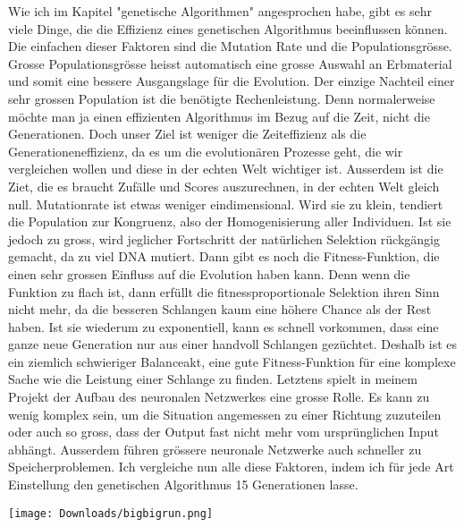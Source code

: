 \documentclass[10pt,a4paper,ngerman,english]{article}
\begin{document}
Wie ich im Kapitel "genetische Algorithmen" angesprochen habe, gibt es sehr viele Dinge, die die Effizienz eines genetischen Algorithmus beeinflussen können. Die einfachen dieser Faktoren sind die Mutation Rate und die Populationsgrösse. Grosse Populationsgrösse heisst automatisch eine grosse Auswahl an Erbmaterial und somit eine bessere Ausgangslage für die Evolution. Der einzige Nachteil einer sehr grossen Population ist die benötigte Rechenleistung. Denn normalerweise möchte man ja einen effizienten Algorithmus im Bezug auf die Zeit, nicht die Generationen. Doch unser Ziel ist weniger die Zeiteffizienz als die Generationeneffizienz, da es um die evolutionären Prozesse geht, die wir vergleichen wollen und diese in der echten Welt wichtiger ist. Ausserdem ist die Ziet, die es braucht Zufälle und Scores auszurechnen, in der echten Welt gleich null. Mutationrate ist etwas weniger eindimensional. Wird sie zu klein, tendiert die Population zur Kongruenz, also der Homogenisierung aller Individuen. Ist sie jedoch zu gross, wird jeglicher Fortschritt der natürlichen Selektion rückgängig gemacht, da zu viel DNA mutiert. Dann gibt es noch die Fitness-Funktion, die einen sehr grossen Einfluss auf die Evolution haben kann. Denn wenn die Funktion zu flach ist, dann erfüllt die fitnessproportionale Selektion ihren Sinn nicht mehr, da die besseren Schlangen kaum eine höhere Chance als der Rest haben. Ist sie wiederum zu exponentiell, kann es schnell vorkommen, dass eine ganze neue Generation nur aus einer handvoll Schlangen gezüchtet. Deshalb ist es ein ziemlich schwieriger Balanceakt, eine gute Fitness-Funktion für eine komplexe Sache wie die Leistung einer Schlange zu finden. Letztens spielt in meinem Projekt der Aufbau des neuronalen Netzwerkes eine grosse Rolle. Es kann zu wenig komplex sein, um die Situation angemessen zu einer Richtung zuzuteilen oder auch so gross, dass der Output fast nicht mehr vom ursprünglichen Input abhängt. Ausserdem führen grössere neuronale Netzwerke auch schneller zu Speicherproblemen. Ich vergleiche nun alle diese Faktoren, indem ich für jede Art Einstellung den genetischen Algorithmus 15 Generationen lasse.

\begin{center}
    \texttt{[image: Downloads/bigbigrun.png]}
\end{center}
\end{document}
